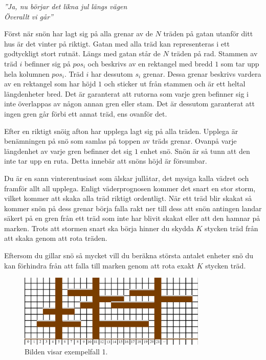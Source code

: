 
\begin{center}
\textit{''Ja, nu börjar det likna jul längs vägen\\ Överallt vi går''}
\end{center}

\noindent
Först när snön har lagt sig på alla grenar av de $N$ träden på gatan utanför ditt hus är det vinter på riktigt. 
Gatan med alla träd kan representeras i ett godtyckligt stort rutnät.
Längs med gatan står de $N$ träden på rad. Stammen av träd $i$ befinner sig på $pos_i$ och beskrivs av en
rektangel med bredd $1$ som tar upp hela kolumnen $pos_i$. Träd $i$ har dessutom $s_i$ grenar. Dessa grenar beskrivs vardera av en
rektangel som har höjd $1$ och sticker ut från stammen och är ett heltal längdenheter bred.
Det är garanterat att rutorna som varje gren befinner sig i inte överlappas av någon annan gren eller stam. 
Det är dessutom garanterat att ingen gren går förbi ett annat träd, ens ovanför det.

Efter en riktigt snöig afton har upplega lagt sig på alla träden. Upplega är benämningen på snö
som samlas på toppen av träds grenar. 
Ovanpå varje längdenhet av varje gren befinner det sig $1$ enhet snö. Snön är så tunn att den inte tar
upp en ruta. Detta innebär att snöns höjd är försumbar.

Du är en sann vinterentusiast som älskar jullåtar, det mysiga kalla vädret och framför allt all upplega. 
Enligt väderprognosen kommer det snart en stor storm, vilket kommer att skaka alla träd riktigt ordentligt. 
När ett träd blir skakat så kommer snön på dess grenar börja falla rakt ner till dess att snön antingen
landar säkert på en gren från ett träd som inte har blivit skakat eller att den hamnar på marken.
Trots att stormen snart ska börja hinner du skydda $K$ stycken träd från att skaka genom att rota träden.

Eftersom du gillar snö så mycket vill du beräkna största antalet enheter snö du kan förhindra från att
falla till marken genom att rota exakt $K$ stycken träd.

\begin{centering}
  \begin{figure}[h]
      \centering
      \includegraphics[width=0.8\textwidth]{sample1.png}
      \caption{Bilden visar exempelfall 1.}
  \end{figure}
\end{centering}


